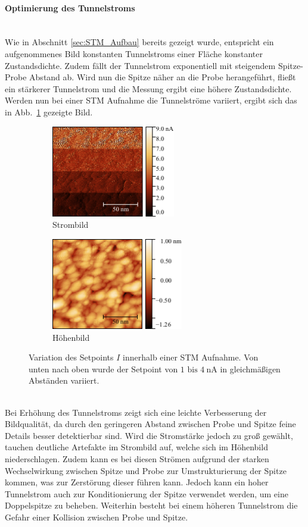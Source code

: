 \documentclass[a4paper,twoside,final]{article}
\begin{document}
\paragraph{Optimierung des Tunnelstroms}\label{par:OptimierungTunnelstrom}$~$\\
Wie in Abschnitt \ref{sec:STM_Aufbau} bereits gezeigt wurde, entspricht ein aufgenommenes Bild konstanten Tunnelstroms einer Fläche konstanter Zustandsdichte. Zudem fällt der Tunnelstrom exponentiell mit steigendem Spitze-Probe Abstand ab. Wird nun die Spitze näher an die Probe herangeführt, fließt ein stärkerer Tunnelstrom und die Messung ergibt eine höhere Zustandsdichte. Werden nun bei einer STM Aufnahme die Tunnelströme variiert, ergibt sich das in Abb.~\ref{fig:Stromvariation_1} gezeigte Bild.
\begin{figure}[htp]
    \centering
    \begin{subfigure}{0.45\textwidth}
        \includegraphics[height=4cm]{Bilder/Image01958_Stromvariation_Strom.pdf}
        \caption{Strombild}
    \end{subfigure}
    \hspace{0.5cm}
    \begin{subfigure}{0.45\textwidth}
        \includegraphics[height=4cm]{Bilder/Image01958_Stromvariation.pdf}
        \caption{Höhenbild}
    \end{subfigure}
    \caption{Variation des Setpoints $I$ innerhalb einer STM Aufnahme. Von unten nach oben wurde der Setpoint von $1 \text{ bis } \SI{4}{\nano\ampere}$ in gleichmäßigen Abständen variiert.}
    \label{fig:Stromvariation_1}
\end{figure}\\
Bei Erhöhung des Tunnelstroms zeigt sich eine leichte Verbesserung der Bildqualität, da durch den geringeren Abstand zwischen Probe und Spitze feine Details besser detektierbar sind. Wird die Stromstärke jedoch zu groß gewählt, tauchen deutliche Artefakte im Strombild auf, welche sich im Höhenbild niederschlagen. Zudem kann es bei diesen Strömen aufgrund der starken Wechselwirkung zwischen Spitze und Probe zur Umstrukturierung der Spitze kommen, was zur Zerstörung dieser führen kann. Jedoch kann ein hoher Tunnelstrom auch zur Konditionierung der Spitze verwendet werden, um eine Doppelspitze zu beheben. Weiterhin besteht bei einem höheren Tunnelstrom die Gefahr einer Kollision zwischen Probe und Spitze.\\
\end{document}

